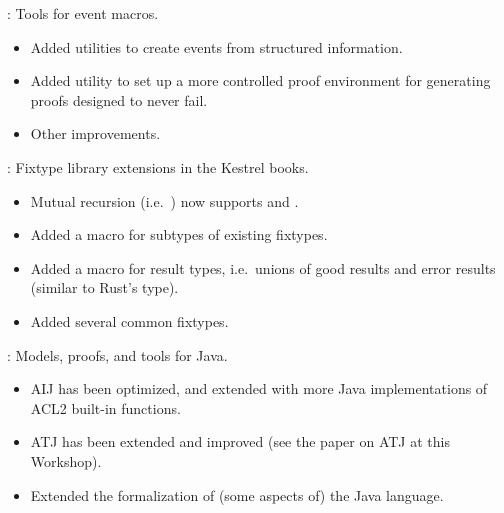 \begin{frame}

\implibtitle

:
Tools for event macros.
\begin{itemize}
\item Added utilities to create events from structured information.
\item Added utility to set up a more controlled proof environment
      for generating proofs designed to never fail.
\item Other improvements.
\end{itemize}

\end{frame}


\begin{frame}

\implibtitle

:
Fixtype library extensions in the Kestrel books.
\begin{itemize}
\item Mutual recursion (i.e.\ )
      now supports  and .
\item Added a macro  for subtypes of existing fixtypes.
\item Added a macro  for result types,
      i.e.\ unions of good results and error results
      (similar to Rust's  type).
\item Added several common fixtypes.
\end{itemize}

\end{frame}


\begin{frame}

\implibtitle

:
Models, proofs, and tools for Java.
\begin{itemize}
\item AIJ has been optimized,
      and extended with more Java implementations of ACL2 built-in functions.
\item ATJ has been extended and improved
      (see the paper on ATJ at this Workshop).
\item Extended the formalization of (some aspects of) the Java language.
\end{itemize}

\end{frame}

